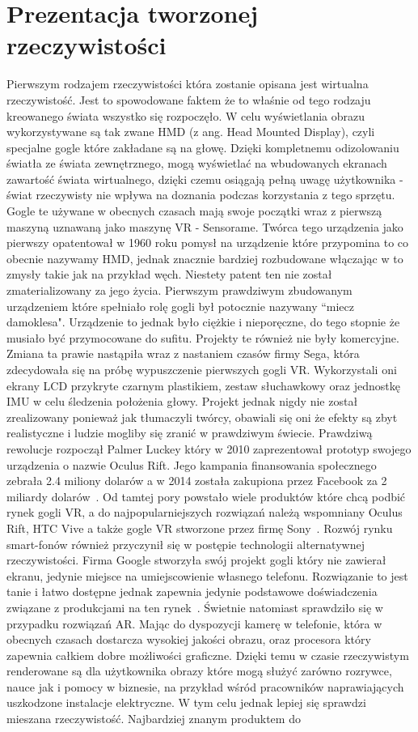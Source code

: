 \section{Prezentacja tworzonej rzeczywistości}
\label{sec:okulary}
	Pierwszym rodzajem rzeczywistości która zostanie opisana jest wirtualna rzeczywistość. Jest to spowodowane faktem że to właśnie od tego rodzaju kreowanego świata wszystko się rozpoczęło. W celu wyświetlania obrazu wykorzystywane są tak zwane HMD (z ang. Head Mounted Display), czyli specjalne gogle które zakładane są na głowę. Dzięki kompletnemu odizolowaniu światła ze świata zewnętrznego, mogą wyświetlać na wbudowanych ekranach zawartość świata wirtualnego, dzięki czemu osiągają pełną uwagę użytkownika - świat rzeczywisty nie wpływa na doznania podczas korzystania z tego sprzętu. Gogle te używane w obecnych czasach mają swoje początki wraz z pierwszą maszyną uznawaną jako maszynę VR - Sensorame. Twórca tego urządzenia jako pierwszy opatentował w 1960 roku pomysł na urządzenie które przypomina to co obecnie nazywamy HMD, jednak znacznie bardziej rozbudowane włączając w to zmysły takie jak na przykład węch. Niestety patent ten nie został zmaterializowany za jego życia. Pierwszym prawdziwym zbudowanym urządzeniem które spełniało rolę gogli był potocznie nazywany ``miecz damoklesa". Urządzenie to jednak było ciężkie i nieporęczne, do tego stopnie że musiało być przymocowane do sufitu. Projekty te również nie były komercyjne. Zmiana ta prawie nastąpiła wraz z nastaniem czasów firmy Sega, która zdecydowała się na próbę wypuszczenie pierwszych gogli VR. Wykorzystali oni ekrany LCD przykryte czarnym plastikiem, zestaw słuchawkowy oraz jednostkę IMU w celu śledzenia położenia głowy. Projekt jednak nigdy nie został zrealizowany ponieważ jak tłumaczyli twórcy, obawiali się oni że efekty są zbyt realistyczne i ludzie mogliby się zranić w prawdziwym świecie. Prawdziwą rewolucje rozpoczął Palmer Luckey który w 2010 zaprezentował prototyp swojego urządzenia o nazwie Oculus Rift. Jego kampania finansowania społecznego zebrała 2.4 miliony dolarów a w 2014 została zakupiona przez Facebook za 2 miliardy dolarów~\cite{hd1}. Od tamtej pory powstało wiele produktów które chcą podbić rynek gogli VR, a do najpopularniejszych rozwiązań należą wspomniany Oculus Rift, HTC Vive a także gogle VR stworzone przez firmę Sony~\cite{hd2}. Rozwój rynku smart-fonów również przyczynił się w postępie technologii alternatywnej rzeczywistości. Firma Google stworzyła swój projekt gogli który nie zawierał ekranu, jedynie miejsce na umiejscowienie własnego telefonu. Rozwiązanie to jest tanie i łatwo dostępne jednak zapewnia jedynie podstawowe doświadczenia związane z produkcjami na ten rynek~\cite{daydream}. Świetnie natomiast sprawdziło się w przypadku rozwiązań AR. Mając do dyspozycji kamerę w telefonie, która w obecnych czasach dostarcza wysokiej jakości obrazu, oraz procesora który zapewnia całkiem dobre możliwości graficzne. Dzięki temu w czasie rzeczywistym renderowane są dla użytkownika obrazy które mogą służyć zarówno rozrywce, nauce jak i pomocy w biznesie, na przykład wśród pracowników naprawiających uszkodzone instalacje elektryczne. W tym celu jednak lepiej się sprawdzi mieszana rzeczywistość. Najbardziej znanym produktem do 
